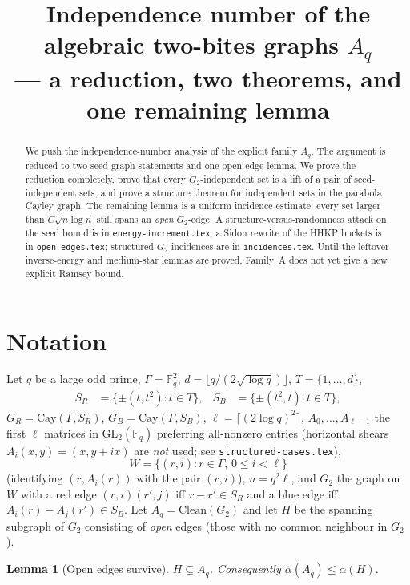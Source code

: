 \documentclass[11pt]{article}
\title{Independence number of the algebraic two-bites graphs $A_q$\\
--- a reduction, two theorems, and one remaining lemma}
\date{}
\newtheorem{lemma}[theorem]{Lemma}
\theoremstyle{definition}
\newcommand{\F}{\mathbb{F}}
\begin{document}
\maketitle

\begin{abstract}
We push the independence-number analysis of the explicit family $A_q$.
The argument is reduced to two seed-graph statements and one open-edge lemma.
We prove the reduction completely, prove that every $G_2$-independent set is a lift of a pair of seed-independent sets, and prove a structure theorem for independent sets in the parabola Cayley graph.
The remaining lemma is a uniform incidence estimate: every set larger than $C\sqrt{n\log n}$ still spans an \emph{open} $G_2$-edge.
A structure-versus-randomness attack on the seed bound is in \texttt{energy-increment.tex}; a Sidon rewrite of the HHKP buckets is in \texttt{open-edges.tex}; structured $G_2$-incidences are in \texttt{incidences.tex}.
Until the leftover inverse-energy and medium-star lemmas are proved, Family~A does not yet give a new explicit Ramsey bound.
\end{abstract}

\section{Notation}

Let $q$ be a large odd prime,
$\Gamma=\F_q^{2}$,
$d=\lfloor q/(2\sqrt{\log q})\rfloor$,
$T=\{1,\dots,d\}$,
\begin{align*}
  S_R &=\{\pm(t,t^{2}):t\in T\},
  &
  S_B &=\{\pm(t^{2},t):t\in T\},
\end{align*}
$G_R=\mathrm{Cay}(\Gamma,S_R)$, $G_B=\mathrm{Cay}(\Gamma,S_B)$,
$\ell=\lceil(2\log q)^{2}\rceil$,
$A_0,\dots,A_{\ell-1}$ the first $\ell$ matrices in $\mathrm{GL}_2(\F_q)$ preferring all-nonzero entries
(horizontal shears $A_i(x,y)=(x,y+ix)$ are \emph{not} used; see \texttt{structured-cases.tex}),
\[
  W=\bigl\{(r,i):r\in\Gamma,\,0\le i<\ell\bigr\}
\]
(identifying $(r,A_i(r))$ with the pair $(r,i)$),
$n=q^{2}\ell$,
and $G_2$ the graph on $W$ with a red edge $(r,i)(r',j)$ iff $r-r'\in S_R$ and a blue edge iff $A_i(r)-A_j(r')\in S_B$.
Let $A_q=\mathrm{Clean}(G_2)$ and let $H$ be the spanning subgraph of $G_2$ consisting of \emph{open} edges (those with no common neighbour in $G_2$).

\begin{lemma}[Open edges survive]\label{lem:open-live}
$H\subseteq A_q$. Consequently $\alpha(A_q)\le\alpha(H)$.
\end{lemma}
\end{document}
